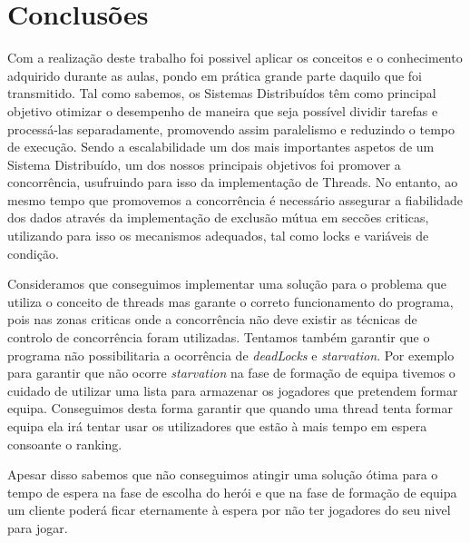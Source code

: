 \chapter{Conclusões }

Com a realização deste trabalho foi possivel aplicar os conceitos e o conhecimento adquirido durante as aulas, pondo em prática grande parte daquilo que  foi transmitido. Tal como sabemos, os Sistemas Distribuídos têm como principal objetivo otimizar o desempenho de maneira que seja possível dividir tarefas e processá-las separadamente, promovendo assim paralelismo e reduzindo o tempo de execução.
Sendo a escalabilidade um dos mais importantes aspetos de um Sistema Distribuído,
um dos nossos principais objetivos foi promover a concorrência, usufruindo para isso
da implementação de Threads. No entanto, ao mesmo tempo que promovemos a concorrência é necessário assegurar a fiabilidade dos dados através da implementação de
exclusão mútua em seccões criticas, utilizando para isso os mecanismos adequados, tal
como locks e variáveis de condição. 

Consideramos que conseguimos implementar uma solução para o problema que utiliza o conceito de threads mas garante o correto funcionamento do programa, pois nas zonas criticas onde a concorrência não deve existir as técnicas de controlo de concorrência foram utilizadas. Tentamos também garantir que o programa não possibilitaria a ocorrência de \textit{deadLocks} e \textit{starvation}. Por exemplo para garantir que não ocorre \textit{starvation} na fase de formação de equipa tivemos o cuidado de utilizar uma lista para armazenar os jogadores que pretendem formar equipa. Conseguimos desta forma garantir que quando uma thread tenta formar equipa ela irá tentar usar os utilizadores que estão à mais tempo em espera consoante o ranking. 

Apesar disso sabemos que não conseguimos atingir uma solução ótima para o tempo de espera na fase de escolha do herói e que na fase de formação de equipa um cliente poderá ficar eternamente à espera por não ter jogadores do seu nivel para jogar. 

